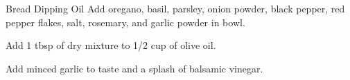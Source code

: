 \documentclass[../cookbook.tex]{subfiles}
\begin{document}
\begin{recipe}{Bread Dipping Oil}{}{}
    Add oregano, basil, parsley, onion powder,
    black pepper, red pepper flakes, salt, rosemary,
    and garlic powder in bowl.

    Add 1 tbsp of dry mixture to 1/2 cup of olive oil.

    Add minced garlic to taste and a splash
    of balsamic vinegar.
\end{recipe}
\end{document}
